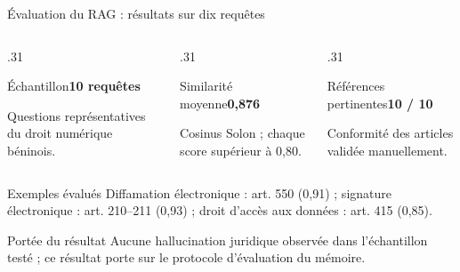 \documentclass[aspectratio=169,10pt]{beamer}
\begin{document}
\begin{frame}{Évaluation du RAG : résultats sur dix requêtes}
  \begin{columns}[T,onlytextwidth]
    \begin{column}{.31\textwidth}\begin{block}{Échantillon}\centering\Large\textbf{10 requêtes}\par\small Questions représentatives du droit numérique béninois.\end{block}\end{column}
    \begin{column}{.31\textwidth}\begin{block}{Similarité moyenne}\centering\Huge\color{teal}\textbf{0,876}\par\small Cosinus Solon ; chaque score supérieur à 0,80.\end{block}\end{column}
    \begin{column}{.31\textwidth}\begin{block}{Références pertinentes}\centering\Huge\color{teal}\textbf{10 / 10}\par\small Conformité des articles validée manuellement.\end{block}\end{column}
  \end{columns}
  \begin{block}{Exemples évalués}
    Diffamation électronique : art. 550 (0,91) ; signature électronique : art. 210--211 (0,93) ; droit d'accès aux données : art. 415 (0,85).
  \end{block}
  \begin{alertblock}{Portée du résultat}
    Aucune hallucination juridique observée dans l'échantillon testé ; ce résultat porte sur le protocole d'évaluation du mémoire.
  \end{alertblock}
\end{frame}
\end{document}

